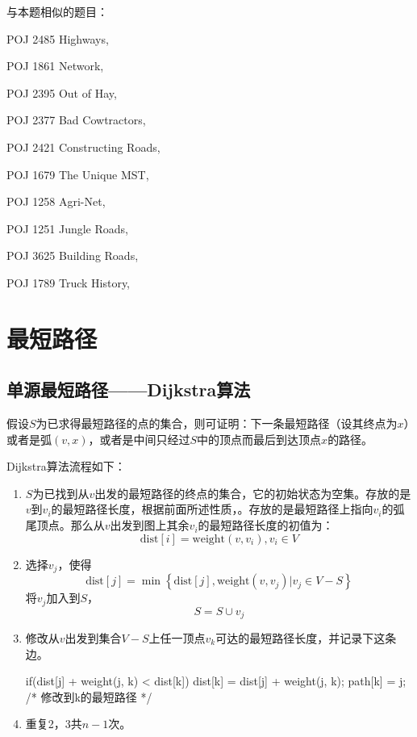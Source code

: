 与本题相似的题目：
\begindot
\item POJ 2485 Highways, 
\item POJ 1861 Network, 
\item POJ 2395 Out of Hay, 
\item POJ 2377 Bad Cowtractors, 
\item POJ 2421 Constructing Roads, 
\item POJ 1679 The Unique MST, 
\item POJ 1258 Agri-Net, 
\item POJ 1251 Jungle Roads, 
\item POJ 3625 Building Roads, 
\item POJ 1789 Truck History, 
\myenddot


\section{最短路径} %

\subsection{单源最短路径——Dijkstra算法}
\label{sec:dijkstra}

假设$S$为已求得最短路径的点的集合，则可证明：下一条最短路径（设其终点为$x$）或者是弧$(v, x)$，或者是中间只经过$S$中的顶点而最后到达顶点$x$的路径。

Dijkstra算法流程如下：
\begin{enumerate}
\item $S$为已找到从$v$出发的最短路径的终点的集合，它的初始状态为空集。存放的是$v$到$v_i$的最短路径长度，根据前面所述性质，。存放的是最短路径上指向$v_i$的弧尾顶点。那么从$v$出发到图上其余$v_i$的最短路径长度的初值为：
$$
\text{dist}[i] = \text{weight}(v, v_i), v_i \in V
$$
\item 选择$v_j$，使得
$$
\text{dist}[j]=\min\left\{\text{dist}[j], \text{weight}(v, v_j)|v_j \in V-S\right\}
$$
将$v_j$加入到$S$，
$$
S = S \cup {v_j}
$$
\item 修改从$v$出发到集合$V-S$上任一顶点$v_k$可达的最短路径长度，并记录下这条边。
\begin{Code}
if(dist[j] + weight(j, k) < dist[k]) {
    dist[k] = dist[j] + weight(j, k);
    path[k] = j; /* 修改到k的最短路径 */
}
\end{Code}
\item 重复2，3共$n-1$次。
\end{enumerate}

